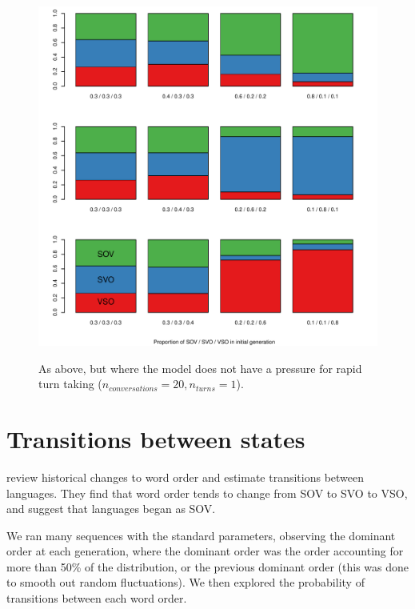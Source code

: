 \documentclass[12pt]{article}
\begin{document}
\begin{figure}[htbp]
\begin{center}
\includegraphics[width=\linewidth]{../images/pdf/InitialConditions_noTTpressure.pdf}
\caption{As above, but where the model does not have a pressure for rapid turn taking ($n_{conversations}=20, n_{turns}=1$).}
\label{Fig:InitialConditionsNoTT}
\label{default}
\end{center}
\end{figure}

\clearpage
\newpage

\section{Transitions between states}

\cite{gell2011origin} review historical changes to word order and estimate transitions between languages.  They find that word order tends to change from SOV to SVO to VSO, and suggest that languages began as SOV.  

We ran many sequences with the standard parameters, observing the dominant order at each generation, where the dominant order was the order accounting for more than 50\% of the distribution, or the previous dominant order (this was done to smooth out random fluctuations). We then explored the probability of transitions between each word order.  
\end{document}
